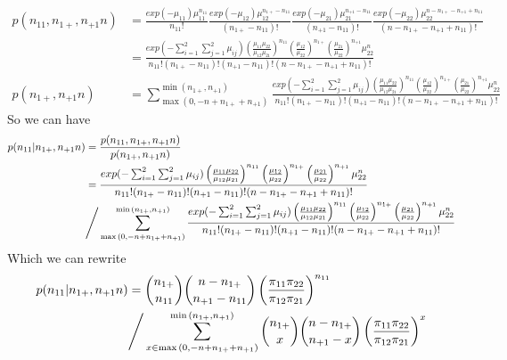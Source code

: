 \begin{itemize}
\begin{align*}
	p(n_{11}, n_{1+}, n_{+1} n) &= \frac{exp(-\mu_{11})\mu_{11}^{n_{11}} }{n_{11}!} \frac{exp(-\mu_{12})\mu_{12}^{n_{1+} - n_{11}}}{(n_{1+} - n_{11})!} \frac{exp(-\mu_{21})\mu_{21}^{n_{+1} - n_{11}}}{(n_{+1} - n_{11})!} \frac{exp(-\mu_{22})\mu_{22}^{n- n_{1+} - n_{+1} + n_{11}}}{(n- n_{1+} - n_{+1} + n_{11})!}\\
	&= \frac{exp(-\sum_{i=1}^2 \sum_{j=1}^2 \mu_{ij}) \left( \frac{\mu_{11} \mu_{22}}{\mu_{12} \mu_{21}}\right) ^{n_{11}} \left(\frac{\mu_{12}}{\mu_{22}} \right)^{n_{1+}} \left(\frac{\mu_{21}}{\mu_{22}} \right)^{n_{+1}} \mu_{22}^{n}} {n_{11}! (n_{1+} - n_{11})! (n_{+1} - n_{11})! (n- n_{1+} - n_{+1} + n_{11})!}\\
	p(n_{1+}, n_{+1} n) &= \sum_{ \max{(0, -n + n_{1+} + n_{+1})}}^{\min{(n_{1+}, n_{+1})}} \frac{exp(-\sum_{i=1}^2 \sum_{j=1}^2 \mu_{ij}) \left( \frac{\mu_{11} \mu_{22}}{\mu_{12} \mu_{21}}\right) ^{n_{11}} \left(\frac{\mu_{12}}{\mu_{22}} \right)^{n_{1+}} \left(\frac{\mu_{21}}{\mu_{22}} \right)^{n_{+1}} \mu_{22}^{n}} {n_{11}! (n_{1+} - n_{11})! (n_{+1} - n_{11})! (n- n_{1+} - n_{+1} + n_{11})!}
\end{align*}
So we can have 
\begin{align*}
	p(n_{11}|n_{1+}, n_{+1} n) &= \frac{p(n_{11}, n_{1+}, n_{+1} n)}{p(n_{1+}, n_{+1} n)}\\
	 &= \frac{exp(-\sum_{i=1}^2 \sum_{j=1}^2 \mu_{ij}) \left( \frac{\mu_{11} \mu_{22}}{\mu_{12} \mu_{21}}\right) ^{n_{11}} \left(\frac{\mu_{12}}{\mu_{22}} \right)^{n_{1+}} \left(\frac{\mu_{21}}{\mu_{22}} \right)^{n_{+1}} \mu_{22}^{n}} {n_{11}! (n_{1+} - n_{11})! (n_{+1} - n_{11})! (n- n_{1+} - n_{+1} + n_{11})!} \\
	 & \Bigg{/} \sum_{ \max{(0, -n + n_{1+} + n_{+1})}}^{\min{(n_{1+}, n_{+1})}} \frac{exp(-\sum_{i=1}^2 \sum_{j=1}^2 \mu_{ij}) \left( \frac{\mu_{11} \mu_{22}}{\mu_{12} \mu_{21}}\right) ^{n_{11}} \left(\frac{\mu_{12}}{\mu_{22}} \right)^{n_{1+}} \left(\frac{\mu_{21}}{\mu_{22}} \right)^{n_{+1}} \mu_{22}^{n}} {n_{11}! (n_{1+} - n_{11})! (n_{+1} - n_{11})! (n- n_{1+} - n_{+1} + n_{11})!}
\end{align*}	
Which we can rewrite 
\begin{align*}
	p(n_{11}|n_{1+}, n_{+1} n) &= {n_{1+} \choose n_{11}} {n - n_{1+} \choose n_{+1}-n_{11}} \left( \frac{\pi_{11} \pi_{22}}{\pi_{12} \pi_{21}} \right)^{n_{11}}\\
	& \Bigg{/}  \sum_{x \in \max{(0, -n + n_{1+} + n_{+1})}}^{\min{(n_{1+}, n_{+1})}} {n_{1+} \choose x} {n - n_{1+} \choose n_{+1}-x} \left( \frac{\pi_{11} \pi_{22}}{\pi_{12} \pi_{21}}\right) ^x
\end{align*}


\end{itemize}
